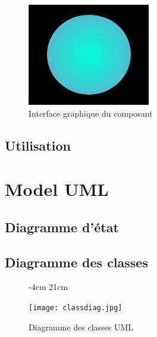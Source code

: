 \documentclass[a4paper,11pt]{article}
\begin{document}
	\begin{figure}[H]
		\begin{center}
			\includegraphics[scale=0.5]{comdescpicture.jpg}
			\caption{Interface graphique du composant}
			\label{Interface graphique du composant}
		\end{center}
	\end{figure}
    \subsection{Utilisation}
    

    \section{Model UML}
    \subsection{Diagramme d'état}
    \subsection{Diagramme des classes}
    \begin{figure}[H]
    	 -4cm 21cm
    	\begin{center}
    		\texttt{[image: classdiag.jpg]}
    		\caption{Diagramme des classes UML}
    		\label{Diagramme des classes UML}
    	\end{center}
    \end{figure}
\end{document}
